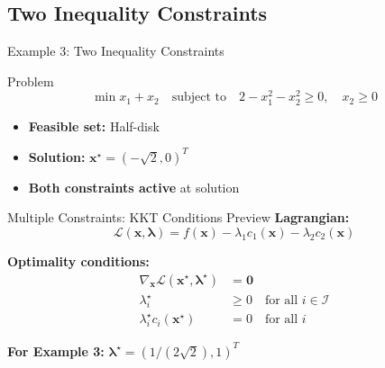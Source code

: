 \documentclass[aspectratio=1610]{beamer}
\begin{document}
\subsection{Two Inequality Constraints}
\begin{frame}{Example 3: Two Inequality Constraints}
  \begin{block}{Problem}
    $$\min x_1 + x_2 \quad \text{subject to} \quad 2 - x_1^2 - x_2^2 \geq 0, \quad x_2 \geq 0$$
  \end{block}
  
  \begin{itemize}
    \item \textbf{Feasible set:} Half-disk
    \item \textbf{Solution:} $\mathbf{x}^{\star} = (-\sqrt{2}, 0)^T$
    \item \textbf{Both constraints active} at solution
  \end{itemize}
  
  \vspace{0.3cm}
\end{frame}

\begin{frame}{Multiple Constraints: KKT Conditions Preview}
  \textbf{Lagrangian:}
  $$\mathcal{L}(\mathbf{x}, \boldsymbol{\lambda}) = f(\mathbf{x}) - \lambda_1 c_1(\mathbf{x}) - \lambda_2 c_2(\mathbf{x})$$
  
  \textbf{Optimality conditions:}
  \begin{align}
    \nabla_{\mathbf{x}} \mathcal{L}(\mathbf{x}^{\star}, \boldsymbol{\lambda}^{\star}) &= \mathbf{0} \\
    \lambda_i^{\star} &\geq 0 \quad \text{for all } i \in \mathcal{I} \\
    \lambda_i^{\star} c_i(\mathbf{x}^{\star}) &= 0 \quad \text{for all } i
  \end{align}
  
  \vspace{0.3cm}
  \textbf{For Example 3:} $\boldsymbol{\lambda}^{\star} = (1/(2\sqrt{2}), 1)^T$
\end{frame}
\end{document}

